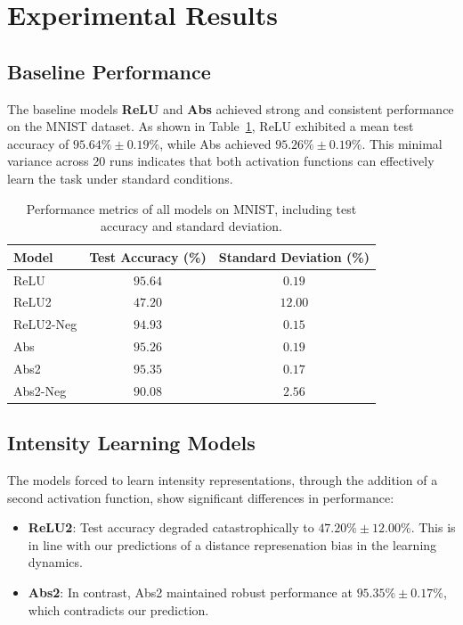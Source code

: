 \section{Experimental Results}

\subsection{Baseline Performance}
The baseline models \textbf{ReLU} and \textbf{Abs} achieved strong and consistent performance on the MNIST dataset. As shown in Table~\ref{tab:baseline_performance}, ReLU exhibited a mean test accuracy of $95.64\% \pm 0.19\%$, while Abs achieved $95.26\% \pm 0.19\%$. This minimal variance across 20 runs indicates that both activation functions can effectively learn the task under standard conditions.

\begin{table}[ht]
\centering
\begin{tabular}{lcc}
\toprule
\textbf{Model} & \textbf{Test Accuracy (\%)} & \textbf{Standard Deviation (\%)} \\
\midrule
ReLU & $95.64$ & $0.19$ \\
ReLU2 & $47.20$ & $12.00$ \\
ReLU2-Neg & $94.93$ & $0.15$ \\
Abs & $95.26$ & $0.19$ \\
Abs2 & $95.35$ & $0.17$ \\
Abs2-Neg & $90.08$ & $2.56$ \\
\bottomrule
\end{tabular}
\caption{Performance metrics of all models on MNIST, including test accuracy and standard deviation.}
\label{tab:baseline_performance}
\end{table}

\subsection{Intensity Learning Models}
The models forced to learn intensity representations, through the addition of a second activation function, show significant differences in performance:
\begin{itemize}
    \item \textbf{ReLU2}: Test accuracy degraded catastrophically to $47.20\% \pm 12.00\%$. This is in line with our predictions of a distance represenation bias in the learning dynamics.
    \item \textbf{Abs2}: In contrast, Abs2 maintained robust performance at $95.35\% \pm 0.17\%$, which contradicts our prediction.
\end{itemize}

